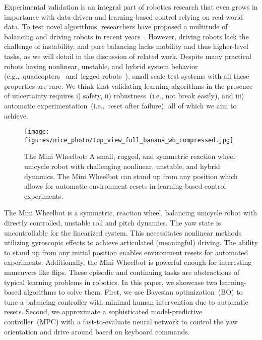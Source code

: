 Experimental validation is an integral part of robotics research that even grows in importance with data-driven and learning-based control relying on real-world data.
To test novel algorithms, researchers have proposed a multitude of balancing and driving robots in recent years~\cite{geist2022wheelbot, hofer2023one, carron2023chronos, bodmer2024optimization, o2020f1tenth}.
However, driving robots lack the challenge of instability, and pure balancing lacks mobility and thus higher-level tasks, as we will detail in the discussion of related work.
Despite many practical robots having nonlinear, unstable, and hybrid system behavior (e.g.,~quadcopters~\cite{hanover2024autonomous} and~legged robots~\cite{kim2017design}), small-scale test systems with all these properties are rare.
We think that validating learning algorithms in the presence of uncertainty requires i) safety, ii) robustness~(i.e., not break easily), and iii) automatic experimentation~(i.e.,~reset  after failure), all of which we aim to achieve.

\begin{figure}[t]
    \centering
    \texttt{[image: figures/nice\_photo/top\_view\_full\_banana\_wb\_compressed.jpg]}%
    \caption{The Mini Wheelbot: A small, rugged, and symmetric reaction wheel unicycle robot with challenging nonlinear, unstable, and hybrid dynamics. The Mini Wheelbot can stand up from any position which allows for automatic environment resets in learning-based control experiments.}\label{fig:firstfig}
    \vspace{-2mm}
\end{figure}


The Mini Wheelbot is a symmetric, reaction wheel, balancing unicycle robot with directly controlled, unstable roll and pitch dynamics.
The yaw state is uncontrollable for the linearized system.
This necessitates nonlinear methods utilizing gyroscopic effects to achieve articulated (meaningful) driving.
The ability to stand up from any initial position enables environment resets for automated experiments.
Additionally, the Mini Wheelbot is powerful enough for interesting maneuvers like flips.
These episodic and continuing tasks are abstractions of typical learning problems in robotics.
In this paper, we showcase two learning-based algorithms to solve them.
First, we use Bayesian optimization~(BO) to tune a balancing controller with minimal human intervention due to automatic resets.
Second, we approximate a sophisticated model-predictive controller~(MPC) with a fast-to-evaluate neural network to control the yaw orientation and drive around based on keyboard commands.

